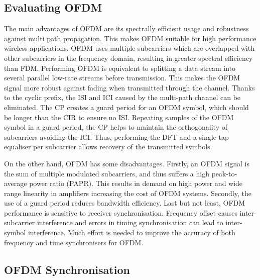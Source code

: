 \subsection{Evaluating OFDM}

The main advantages of OFDM are its spectrally efficient usage and robustness against multi path propagation.
This makes OFDM suitable for high performance wireless applications.
OFDM uses multiple subcarriers which are overlapped with other subcarriers in the frequency domain, resulting in greater spectral efficiency than FDM.
Performing OFDM is equivalent to splitting a data stream into several parallel low-rate streams before transmission.
This makes the OFDM signal more robust against fading when transmitted through the channel.
Thanks to the cyclic prefix, the ISI and ICI caused by the multi-path channel can be eliminated.
The CP creates a guard period for an OFDM symbol, which should be longer than the CIR to ensure no ISI.
Repeating samples of the OFDM symbol in a guard period, the CP helps to maintain the orthogonality of subcarriers avoiding the ICI.
Thus, performing the DFT and a single-tap equaliser per subcarrier allows recovery of the transmitted symbols.

On the other hand, OFDM has some disadvantages.
Firstly, an OFDM signal is the sum of multiple modulated subcarriers, and thus suffers a high peak-to-average power ratio (PAPR).
This results in demand on high power and wide range linearity in amplifiers increasing the cost of OFDM systems.
Secondly, the use of a guard period reduces bandwidth efficiency.
Last but not least, OFDM performance is sensitive to receiver synchronisation. Frequency offset causes inter-subcarrier interference and errors in timing synchronisation can lead to inter-symbol interference.
Much effort is needed to improve the accuracy of both frequency and time synchronisers for OFDM.



\subsection{OFDM Synchronisation}

